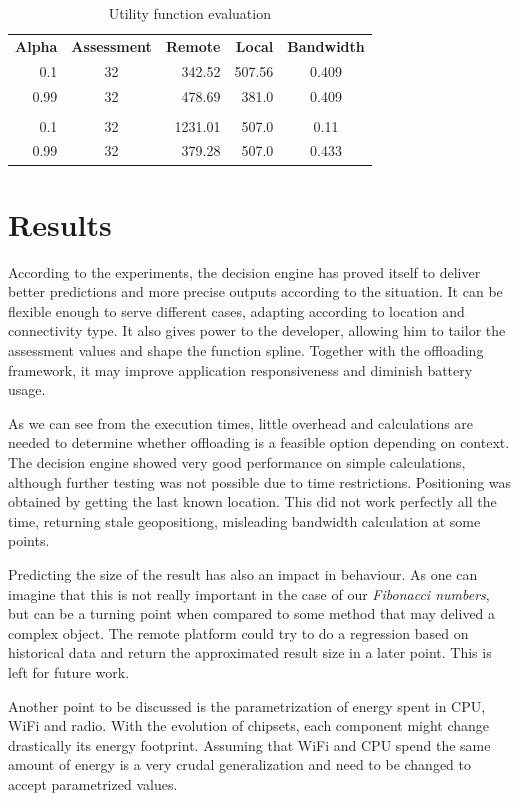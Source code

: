 \documentclass[10pt, conference, letterpaper]{IEEEtran}
\begin{document}
  \begin{table}[!t]
  \centering
  \caption{Utility function evaluation}
  \label{table:alpha}
  \begin{tabular}{rcrrc}
    \textbf{Alpha} & \textbf{Assessment} & \textbf{Remote} & \textbf{Local} & \textbf{Bandwidth} \\
   0.1 & 32  & 342.52 & 507.56 & 0.409  \\
   0.99 & 32  & 478.69 & 381.0 & 0.409  \\
   &  & & &  \\
   0.1 & 32  & 1231.01 & 507.0 & 0.11  \\
   0.99 & 32  & 379.28 & 507.0 & 0.433  \\
  \end{tabular}
  \end{table}

  \section{Results}
  According to the experiments, the decision engine has proved itself to deliver better predictions and more precise outputs according to the situation. It can be flexible enough to serve different cases, adapting according to location and connectivity type. It also gives power to the developer, allowing him to tailor the assessment values and shape the function spline. Together with the offloading framework, it may improve application responsiveness and diminish battery usage.
  
  As we can see from the execution times, little overhead and calculations are needed to determine whether offloading is a feasible option depending on context. The decision engine showed very good performance on simple calculations, although further testing was not possible due to time restrictions. Positioning was obtained by getting the last known location. This did not work perfectly all the time, returning stale geopositiong, misleading bandwidth calculation at some points.

  Predicting the size of the result has also an impact in behaviour. As one can imagine that this is not really important in the case of our \textit{Fibonacci numbers}, but can be a turning point when compared to some method that may delived a complex object. The remote platform could try to do a regression based on historical data and return the approximated result size in a later point. This is left for future work.

  Another point to be discussed is the parametrization of energy spent in CPU, WiFi and radio. With the evolution of chipsets, each component might change drastically its energy footprint. Assuming that WiFi and CPU spend the same amount of energy is a very crudal generalization and need to be changed to accept parametrized values. 
\end{document}
